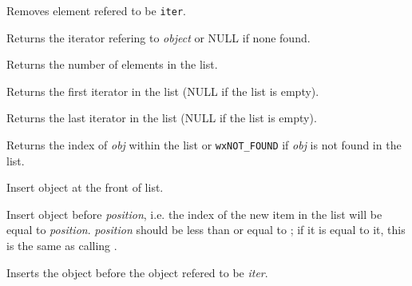 Removes element refered to be {\tt iter}.

\label{wxlistfind}


Returns the iterator refering to {\it object} or NULL if none found.

\label{wxlistgetcount}


Returns the number of elements in the list.

\label{wxlistgetfirst}


Returns the first iterator in the list (NULL if the list is empty).

\label{wxlistgetlast}


Returns the last iterator in the list (NULL if the list is empty).

\label{wxlistindexof}


Returns the index of {\it obj} within the list or {\tt wxNOT\_FOUND} if
{\it obj} is not found in the list.

\label{wxlistinsert1}


Insert object at the front of list.


Insert object before {\it position}, i.e. the index of the new item in the
list will be equal to {\it position}. {\it position} should be less than or
equal to ; if it is equal to it, this is the
same as calling .


Inserts the object before the object refered to be {\it iter}.

